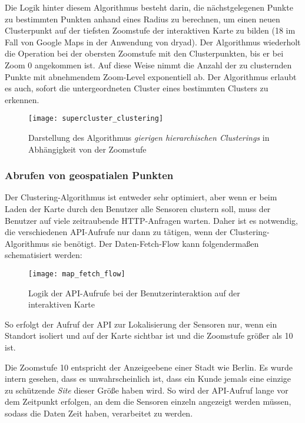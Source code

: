Die Logik hinter diesem Algorithmus besteht darin, die nächstgelegenen Punkte zu bestimmten Punkten anhand eines Radius zu berechnen, um einen neuen Clusterpunkt auf der tiefsten Zoomstufe der interaktiven Karte zu bilden (18 im Fall von Google Maps in der Anwendung von dryad).
Der Algorithmus wiederholt die Operation bei der obersten Zoomstufe mit den Clusterpunkten, bis er bei Zoom 0 angekommen ist.
Auf diese Weise nimmt die Anzahl der zu clusternden Punkte mit abnehmendem Zoom-Level exponentiell ab.
Der Algorithmus erlaubt es auch, sofort die untergeordneten Cluster eines bestimmten Clusters zu erkennen.

\begin{figure}[H]
  \centering
  \texttt{[image: supercluster\_clustering]}
  \caption{Darstellung des Algorithmus \textit{gierigen hierarchischen Clusterings} in Abhängigkeit von der Zoomstufe}
  \label{fig:supercluster_clustering}
\end{figure}

\subsubsection{Abrufen von geospatialen Punkten} \label{sec:fetch_map_api}

Der Clustering-Algorithmus ist entweder sehr optimiert, aber wenn er beim Laden der Karte durch den Benutzer alle Sensoren clustern soll, muss der Benutzer auf viele zeitraubende \ac{HTTP}-Anfragen warten.
Daher ist es notwendig, die verschiedenen API-Aufrufe nur dann zu tätigen, wenn der Clustering-Algorithmus sie benötigt.
Der Daten-Fetch-Flow kann folgendermaßen schematisiert werden:

\begin{figure}[H]
  \centering
  \texttt{[image: map\_fetch\_flow]}
  \caption{Logik der API-Aufrufe bei der Benutzerinteraktion auf der interaktiven Karte}
  \label{fig:map_fetch_flow}
\end{figure}

So erfolgt der Aufruf der API zur Lokalisierung der Sensoren nur, wenn ein Standort isoliert und auf der Karte sichtbar ist und die Zoomstufe größer als 10 ist.

Die Zoomstufe 10 entspricht der Anzeigeebene einer Stadt wie Berlin.
Es wurde intern gesehen, dass es unwahrscheinlich ist, dass ein Kunde jemals eine einzige zu schützende \textit{Site} dieser Größe haben wird.
So wird der API-Aufruf lange vor dem Zeitpunkt erfolgen, an dem die Sensoren einzeln angezeigt werden müssen, sodass die Daten Zeit haben, verarbeitet zu werden.

